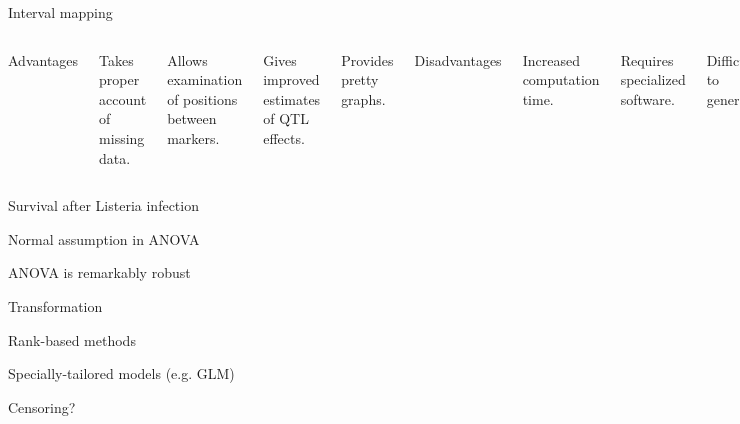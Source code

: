 \documentclass[aspectratio=169,12pt,t]{beamer}
\begin{document}
\begin{frame}{Interval mapping}

\begin{columns}


{\hilit Advantages}

\bi
\item Takes proper account of missing data.
\item Allows examination of positions between markers.
\item Gives improved estimates of QTL effects.
\item Provides pretty graphs.
\ei



{\hilit Disadvantages}

\bi
\item Increased computation time.
\item Requires specialized software.
\item Difficult to generalize.
\item {\vhilit Only considers one QTL at a time.}
\ei


\end{columns}

\end{frame}




\begin{frame}[c]{Survival after Listeria infection}
\end{frame}


\begin{frame}{Normal assumption in ANOVA}

  \bbi
\item ANOVA is remarkably robust
\item Transformation
\item Rank-based methods
\item Specially-tailored models (e.g. GLM)
  \ei

\end{frame}




\begin{frame}[c]{}

\centerline{\Large \color{title} Censoring?}

\end{frame}
\end{document}
